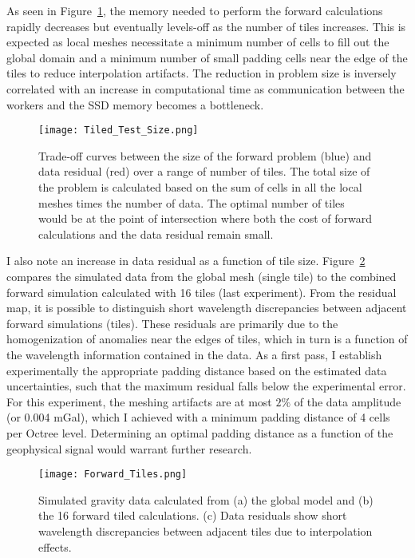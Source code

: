 As seen in Figure~\ref{Tiled_Test_Size}, the memory needed to perform the forward calculations rapidly decreases but eventually levels-off as the number of tiles increases. This is expected as local meshes necessitate a minimum number of cells to fill out the global domain and a minimum number of small padding cells near the edge of the tiles to reduce interpolation artifacts. The reduction in problem size is inversely correlated with an increase in computational time as communication between the workers and the SSD memory becomes a bottleneck.
\begin{figure}[h!]
{\centering
\texttt{[image: Tiled\_Test\_Size.png]}}
\caption{Trade-off curves between the size of the forward problem (blue) and data residual (red) over a range of number of tiles. The total size of the problem is calculated based on the sum of cells in all the local meshes times the number of data. The optimal number of tiles would be at the point of intersection where both the cost of forward calculations and the data residual remain small.}
\label{Tiled_Test_Size}
\end{figure}

I also note an increase in data residual as a function of tile size.
Figure~\ref{Tiled_Residual} compares the simulated data from the global mesh (single tile) to the combined forward simulation calculated with 16 tiles (last experiment). From the residual map, it is possible to distinguish short wavelength discrepancies between adjacent forward simulations (tiles). These residuals are primarily due to the homogenization of anomalies near the edges of tiles, which in turn is a function of the wavelength information contained in the data. As a first pass, I establish experimentally the appropriate padding distance based on the estimated data uncertainties, such that the maximum residual falls below the experimental error. For this experiment, the meshing artifacts are at most $2\%$ of the data amplitude (or 0.004 mGal), which I achieved with a minimum padding distance of 4 cells per Octree level. Determining an optimal padding distance as a function of the geophysical signal would warrant further research. 
\begin{figure}[h!]
{\centering
\texttt{[image: Forward\_Tiles.png]}}
\caption{Simulated gravity data calculated from (a) the global model and (b) the 16 forward tiled calculations. (c) Data residuals show short wavelength discrepancies between adjacent tiles due to interpolation effects.}
\label{Tiled_Residual}
\end{figure}


\endinput

